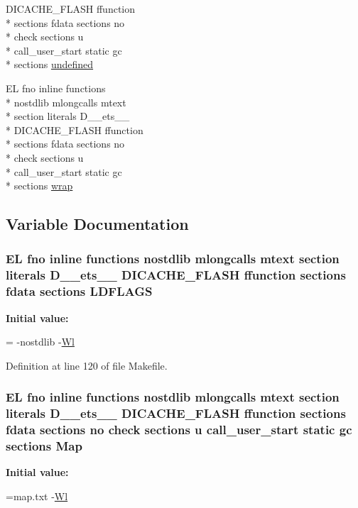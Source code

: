 \begin{DoxyCompactItemize}
D\-I\-C\-A\-C\-H\-E\-\_\-\-F\-L\-A\-S\-H ffunction \\*
sections fdata sections no \\*
check sections u \\*
call\-\_\-user\-\_\-start static gc \\*
sections \hyperlink{Makefile_a7caa220288c6621dffebfc3a50a851e1}{undefined}
\item 
E\-L fno inline functions \\*
nostdlib mlongcalls mtext \\*
section literals D\-\_\-\-\_\-ets\-\_\-\-\_\- \\*
D\-I\-C\-A\-C\-H\-E\-\_\-\-F\-L\-A\-S\-H ffunction \\*
sections fdata sections no \\*
check sections u \\*
call\-\_\-user\-\_\-start static gc \\*
sections \hyperlink{Makefile_a6b04d3dc9ff8a69521845b59ef6c33f1}{wrap}
\end{DoxyCompactItemize}


\subsection{Variable Documentation}
\hypertarget{Makefile_a0b0ec95cdd594ae63274ea3aa92e8bac}{
\subsubsection[{L\-D\-F\-L\-A\-G\-S}]{\setlength{\rightskip}{0pt plus 5cm}E\-L fno inline functions nostdlib mlongcalls mtext section literals D\-\_\-\-\_\-ets\-\_\-\-\_\- D\-I\-C\-A\-C\-H\-E\-\_\-\-F\-L\-A\-S\-H ffunction sections fdata sections L\-D\-F\-L\-A\-G\-S}}\label{Makefile_a0b0ec95cdd594ae63274ea3aa92e8bac}
{\bfseries Initial value\-:}
\begin{DoxyCode}
= -nostdlib 
    -\hyperlink{Makefile_a1af3a6ecef406b93f1a1db145b2cfd43}{Wl}
\end{DoxyCode}


Definition at line 120 of file Makefile.

\hypertarget{Makefile_a3d2682475b097eef42d87fa20f765794}{
\subsubsection[{Map}]{\setlength{\rightskip}{0pt plus 5cm}E\-L fno inline functions nostdlib mlongcalls mtext section literals D\-\_\-\-\_\-ets\-\_\-\-\_\- D\-I\-C\-A\-C\-H\-E\-\_\-\-F\-L\-A\-S\-H ffunction sections fdata sections no check sections u call\-\_\-user\-\_\-start static gc sections Map\hspace{0.3cm}{\ttfamily [static]}}}\label{Makefile_a3d2682475b097eef42d87fa20f765794}
{\bfseries Initial value\-:}
\begin{DoxyCode}
=map.txt  
    -\hyperlink{Makefile_a1af3a6ecef406b93f1a1db145b2cfd43}{Wl}
\end{DoxyCode}


